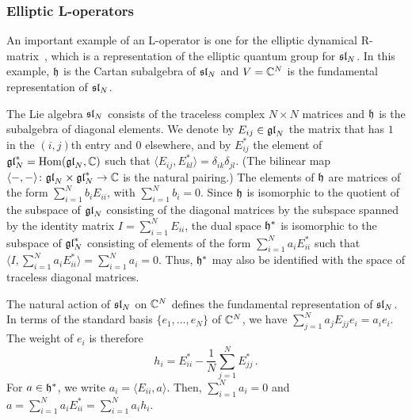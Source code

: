 \subsubsection{Elliptic L-operators}

An important example of an L-operator is one for the elliptic
dynamical R-matrix~\cite{Baxter:1972wf, MR908997, Jimbo:1987mu}, which
is a representation of the elliptic quantum group for $\mathfrak{sl}_N$.  In
this example, $\mathfrak{h}$ is the Cartan subalgebra of $\mathfrak{sl}_N$ and
$V = \mathbb{C}^N$ is the fundamental representation of $\mathfrak{sl}_N$.

The Lie algebra $\mathfrak{sl}_N$ consists of the traceless complex
$N \times N$ matrices and $\mathfrak{h}$ is the subalgebra of diagonal
elements.  We denote by $E_{ij} \in \mathfrak{gl}_N$ the matrix that has $1$ in
the $(i,j)$th entry and $0$ elsewhere, and by $E^*_{ij}$ the element
of $\mathfrak{gl}_N^* = \mathop{\mathrm{Hom}}\nolimits(\mathfrak{gl}_N, \mathbb{C})$ such that
$\langle E_{ij}, E_{kl}^*\rangle = \delta_{ik} \delta_{jl}$.  (The
bilinear map $\langle-,-\rangle\colon \mathfrak{gl}_N \times \mathfrak{gl}_N^* \to \mathbb{C}$
is the natural pairing.)  The elements of $\mathfrak{h}$ are matrices of the
form $\sum_{i=1}^N b_i E_{ii}$, with $\sum_{i=1}^N b_i = 0$.  Since
$\mathfrak{h}$ is isomorphic to the quotient of the subspace of $\mathfrak{gl}_N$
consisting of the diagonal matrices by the subspace spanned by the
identity matrix $I = \sum_{i=1}^N E_{ii}$, the dual space $\mathfrak{h}^*$ is
isomorphic to the subspace of $\mathfrak{gl}_N^*$ consisting of elements of the
form $\sum_{i=1}^N a_i E_{ii}^*$ such that
$\langle I, \sum_{i=1}^N a_i E_{ii}^*\rangle = \sum_{i=1}^N a_i = 0$.
Thus, $\mathfrak{h}^*$ may also be identified with the space of traceless
diagonal matrices.

The natural action of $\mathfrak{sl}_N$ on $\mathbb{C}^N$ defines the fundamental
representation of $\mathfrak{sl}_N$.  In terms of the standard basis
$\{e_1, \dotsc, e_N\}$ of $\mathbb{C}^N$, we have
$\sum_{j=1}^N a_j E_{jj} e_i = a_i e_i$.  The weight of $e_i$ is
therefore
\begin{equation}
  h_i
  = E_{ii}^* - \frac{1}{N} \sum_{j=1}^N E_{jj}^* \,.
\end{equation}
For $a \in \mathfrak{h}^*$, we write $a_i = \langle E_{ii}, a\rangle$.  Then,
$\sum_{i=1}^N a_i = 0$ and
$a = \sum_{i=1}^N a_i E_{ii}^* = \sum_{i=1}^N a_i h_i$.


